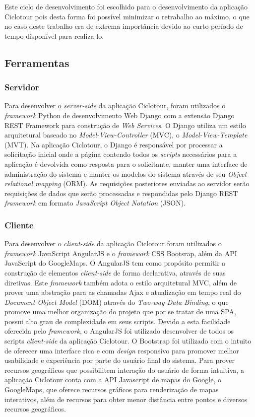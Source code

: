 Este ciclo de desenvolvimento foi escolhido para o desenvolvimento da aplicação Ciclotour pois desta forma foi possível minimizar o retrabalho ao 
máximo, o que no caso deste trabalho era de extrema importância devido ao curto período de tempo disponível para realiza-lo. 

\subsection{Ferramentas}

\subsubsection{Servidor}
Para desenvolver o \textit{server-side} da aplicação Ciclotour, foram utilizados o \textit{framework} Python de desenvolvimento Web Django com a 
extensão Django REST Framework para construção de \textit{Web Services}. O Django utiliza um estilo arquitetural baseado no 
\textit{Model-View-Controller} (MVC), o \textit{Model-View-Template} (MVT). Na aplicação Ciclotour, o Django é responsável por processar a 
solicitação inicial onde a página contendo todos os \textit{scripts} necessários para a aplicação é devolvida como resposta para o solicitante,
manter uma interface de administração do sistema e manter os modelos do sistema através de seu \textit{Object-relational mapping} (ORM). 
As requisições posteriores enviadas ao servidor serão requisições de dados que serão processadas e respondidas pelo Django REST \textit{framework} 
em formato \textit{JavaScript Object Notation} (JSON).

\subsubsection{Cliente}
Para desenvolver o \textit{client-side} da aplicação Ciclotour foram utilizados o \textit{framework} JavaScript AngularJS e o \textit{framework} 
CSS Bootsrap, além da API JavaScript do GoogleMaps. O AngularJS tem como propósito permitir a construção de elementos \textit{client-side} de forma 
declarativa, através de suas diretivas. Este \textit{framework} também adota o estilo arquitetural MVC, além de prover uma abstração para as chamadas
Ajax e atualização em tempo real do \textit{Document Object Model} (DOM) através do \textit{Two-way Data Binding}, o que promove uma melhor 
organização do projeto que por se tratar de uma SPA, possui alto grau de complexidade em seus scripts. Devido a esta facilidade oferecida pelo 
\textit{framework}, o AngularJS foi utilizado desenvolver de todos os scripts \textit{client-side} da aplicação Ciclotour. O Bootstrap foi utilizado 
com o intuito de oferecer uma interface rica e com \textit{design} responsivo para promover melhor usabilidade e experiência por parte do usuário 
final do sistema. Para prover recursos geográficos que possibilitem interação do usuário de forma intuitiva, a aplicação Ciclotour conta com a API 
Javascript de mapas do Google, o GoogleMaps, que oferece recursos gráficos para renderização de mapas interativos, além de recursos para obter menor 
distância entre pontos e diversos recursos geográficos.

